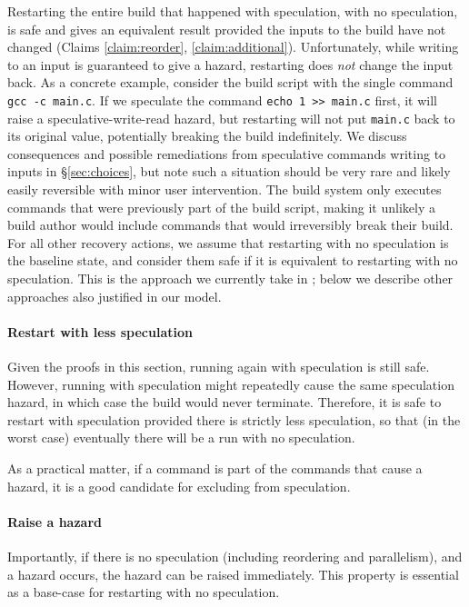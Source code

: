 Restarting the entire build that happened with speculation, with no speculation, is safe and gives an equivalent result provided the inputs to the build have not changed (Claims \ref{claim:reorder}, \ref{claim:additional}). Unfortunately, while writing to an input is guaranteed to give a hazard, restarting does \emph{not} change the input back. As a concrete example, consider the build script with the single command \texttt{gcc -c main.c}. If we speculate the command \texttt{echo 1 >> main.c} first, it will raise a speculative-write-read hazard, but restarting will not put \texttt{main.c} back to its original value, potentially breaking the build indefinitely. We discuss consequences and possible remediations from speculative commands writing to inputs in \S\ref{sec:choices}, but note such a situation should be very rare and likely easily reversible with minor user intervention.  The build system only executes commands that were previously part of the build script, making it unlikely a build author would include commands that would irreversibly break their build.  For all other recovery actions, we assume that restarting with no speculation is the baseline state, and consider them safe if it is equivalent to restarting with no speculation.
%
This is the approach we currently take in \Rattle; below we describe
other approaches also justified in our model.

\paragraph{Restart with less speculation}
\label{sec:recovering}

Given the proofs in this section, running again with speculation is still safe. However, running with speculation might repeatedly cause the same speculation hazard, in which case the build would never terminate. Therefore, it is safe to restart with speculation provided there is strictly less speculation, so that (in the worst case) eventually there will be a run with no speculation.

As a practical matter, if a command is part of the commands that cause a hazard, it is a good candidate for excluding from speculation.

\paragraph{Raise a hazard}

Importantly, if there is no speculation (including reordering and parallelism), and a hazard occurs, the hazard can be raised immediately. This property is essential as a base-case for restarting with no speculation.

